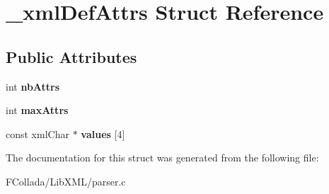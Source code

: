 \hypertarget{struct__xmlDefAttrs}{
\section{\_\-xmlDefAttrs Struct Reference}
\label{struct__xmlDefAttrs}
}
\subsection*{Public Attributes}
\begin{DoxyCompactItemize}
\item 
\hypertarget{struct__xmlDefAttrs_a20197d4be34aea8ce0d55388824cf4f1}{
int {\bfseries nbAttrs}}
\label{struct__xmlDefAttrs_a20197d4be34aea8ce0d55388824cf4f1}

\item 
\hypertarget{struct__xmlDefAttrs_ac8d212729562bf535f1615489df631d4}{
int {\bfseries maxAttrs}}
\label{struct__xmlDefAttrs_ac8d212729562bf535f1615489df631d4}

\item 
\hypertarget{struct__xmlDefAttrs_a4ed967765ea28e1e008c7e963f019bc3}{
const xmlChar $\ast$ {\bfseries values} \mbox{[}4\mbox{]}}
\label{struct__xmlDefAttrs_a4ed967765ea28e1e008c7e963f019bc3}

\end{DoxyCompactItemize}


The documentation for this struct was generated from the following file:\begin{DoxyCompactItemize}
\item 
FCollada/LibXML/parser.c\end{DoxyCompactItemize}
